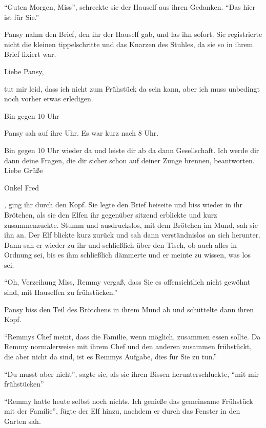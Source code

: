 \enquote{Guten Morgen, Miss}, schreckte sie der Hauself aus ihren Gedanken. \enquote{Das hier ist für Sie.}

Pansy nahm den Brief, den ihr der Hauself gab, und las ihn sofort. Sie registrierte nicht die kleinen tippelschritte und das Knarzen des Stuhles, da sie so in ihrem Brief fixiert war.

\begin{brief}
Liebe Pansy,

tut mir leid, dass ich nicht zum Frühstück da sein kann, aber ich muss unbedingt noch vorher etwas erledigen.

Bin gegen 10 Uhr \gst
\end{brief}

Pansy sah auf ihre Uhr. Es war kurz nach 8 Uhr.

\begin{brief}
Bin gegen 10 Uhr wieder da und leiste dir ab da dann Gesellschaft. Ich werde dir dann deine Fragen, die dir sicher schon auf deiner Zunge brennen, beantworten.
\signumspace
Liebe Grüße

Onkel Fred
\end{brief}

, ging ihr durch den Kopf.  Sie legte den Brief beiseite und biss wieder in ihr Brötchen, als sie den Elfen ihr gegenüber sitzend erblickte und kurz zusammenzuckte. Stumm und ausdruckslos, mit dem Brötchen im Mund, sah sie ihn an. Der Elf blickte kurz zurück und sah dann verständnislos an sich herunter. Dann sah er wieder zu ihr und schließlich über den Tisch, ob auch alles in Ordnung sei, bis es ihm schließlich dämmerte und er meinte zu wissen, was los sei.

\enquote{Oh, Verzeihung Miss, Remmy vergaß, dass Sie es offensichtlich nicht gewöhnt sind, mit Hauselfen zu frühstücken.}

Pansy biss den Teil des Brötchens in ihrem Mund ab und schüttelte dann ihren Kopf.

\enquote{Remmys Chef meint, dass die Familie, wenn möglich, zusammen essen sollte. Da Remmy normalerweise mit ihrem Chef und den anderen zusammen frühstückt, die aber nicht da sind, ist es Remmys Aufgabe, dies für Sie zu tun.}

\enquote{Du musst aber nicht\abs}, sagte sie, als sie ihren Bissen herunterschluckte, \enquote{mit mir frühstücken\abs}

\enquote{Remmy hatte heute selbst noch nichts. \gst Ich genieße das gemeinsame Frühstück mit der Familie}, fügte der Elf hinzu, nachdem er durch das Fenster in den Garten sah.


